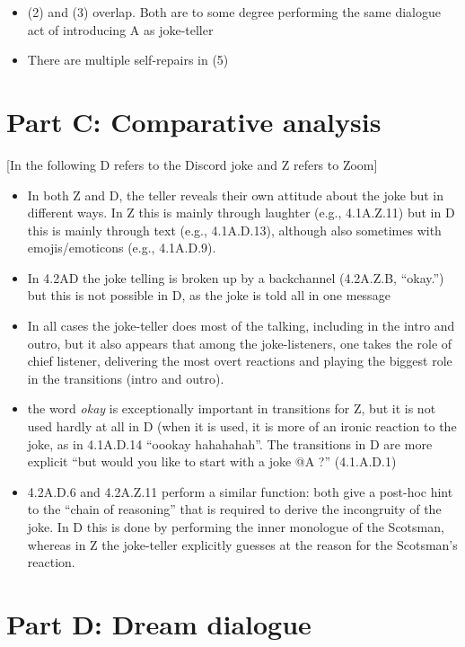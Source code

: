 \documentclass[a4]{scrartcl}
\begin{document}
\begin{itemize}
  \item (2) and (3) overlap. Both are to some degree performing the same dialogue act of introducing A as joke-teller
  \item There are multiple self-repairs in (5)
\end{itemize}

\section{Part C: Comparative analysis}

[In the following D refers to the Discord joke and Z refers to Zoom]

\begin{itemize}
  \item In both Z and D, the teller reveals their own attitude about the joke but in different ways. In Z this is mainly through laughter
    (e.g., 4.1A.Z.11) but in D this is mainly through text (e.g., 4.1A.D.13), although also sometimes with emojis/emoticons (e.g., 4.1A.D.9).
  \item In 4.2AD the joke telling is broken up by a backchannel (4.2A.Z.B, ``okay.'') but this is not possible in D, as the joke is told all in one message
  \item In all cases the joke-teller does most of the talking, including in the intro and outro, but it also appears that among the joke-listeners, one takes the role of chief listener, delivering the most overt reactions and playing the biggest role in the transitions (intro and outro).
  \item the word \emph{okay} is exceptionally important in transitions for Z, but it is not used hardly at all in D (when it is used, it is more
        of an ironic reaction to the joke, as in 4.1A.D.14 ``oookay hahahahah''. The transitions in D are more explicit ``but would you like to start with a joke @A ?'' (4.1.A.D.1)
  \item 4.2A.D.6 and 4.2A.Z.11 perform a similar function: both give a post-hoc hint to the ``chain of reasoning'' that is required to derive
    the incongruity of the joke. In D this is done by performing the inner monologue of the Scotsman, whereas in Z the joke-teller
    explicitly guesses at the reason for the Scotsman's reaction.
\end{itemize}

\section{Part D: Dream dialogue}
\end{document}
